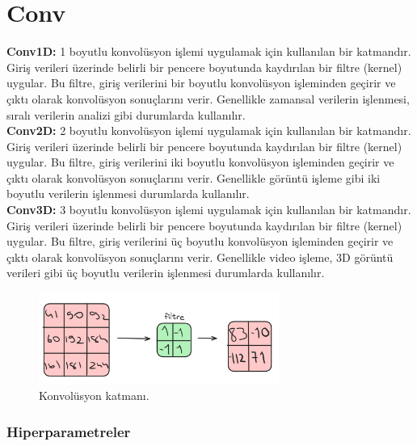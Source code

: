 \section{Conv}
\textbf{Conv1D:} 1 boyutlu konvolüsyon işlemi uygulamak için kullanılan bir katmandır. Giriş verileri üzerinde belirli bir pencere boyutunda kaydırılan bir filtre (kernel) uygular. Bu filtre, giriş verilerini bir boyutlu konvolüsyon işleminden geçirir ve çıktı olarak konvolüsyon sonuçlarını verir. Genellikle zamansal verilerin işlenmesi, sıralı verilerin analizi gibi durumlarda kullanılır.\\
\textbf{Conv2D:} 2 boyutlu konvolüsyon işlemi uygulamak için kullanılan bir katmandır. Giriş verileri üzerinde belirli bir pencere boyutunda kaydırılan bir filtre (kernel) uygular. Bu filtre, giriş verilerini iki boyutlu konvolüsyon işleminden geçirir ve çıktı olarak konvolüsyon sonuçlarını verir. Genellikle görüntü işleme gibi iki boyutlu verilerin işlenmesi durumlarda kullanılır. \\
\textbf{Conv3D:} 3 boyutlu konvolüsyon işlemi uygulamak için kullanılan bir katmandır. Giriş verileri üzerinde belirli bir pencere boyutunda kaydırılan bir filtre (kernel) uygular. Bu filtre, giriş verilerini üç boyutlu konvolüsyon işleminden geçirir ve çıktı olarak konvolüsyon sonuçlarını verir. Genellikle video işleme, 3D görüntü verileri gibi üç boyutlu verilerin işlenmesi durumlarda kullanılır.

\begin{figure}[h]
    \centering
    \includegraphics[width=0.7\textwidth]{images/conv_layer.png}
    \caption{Konvolüsyon katmanı.}
    \label{fig:enter-label}
\end{figure}

\subsubsection{Hiperparametreler}
\begin{table}[h]
\centering
{\scriptsize\renewcommand{\arraystretch}{0.4}
{}}
\end{table}

